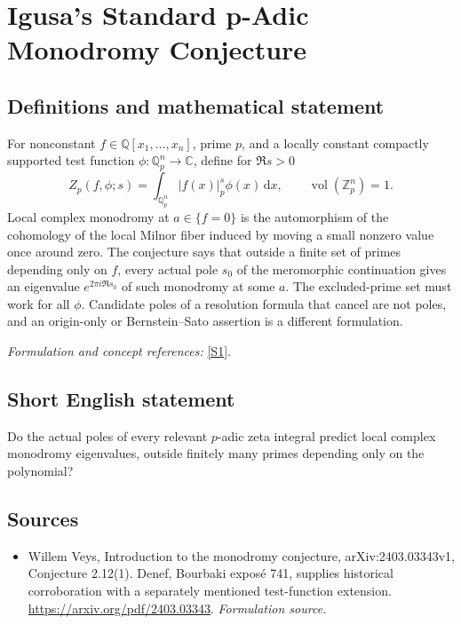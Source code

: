 \documentclass[11pt]{article}
\begin{document}
\section*{\texorpdfstring{Igusa’s Standard p-Adic Monodromy Conjecture}{Igusa’s Standard p-Adic Monodromy Conjecture}}\label{statement}
\subsection{Definitions and mathematical statement}
For nonconstant $f\in{\mathbb{Q}}[x_1,\ldots,x_n]$, prime $p$, and a locally constant compactly supported test function $\phi:{\mathbb{Q}}_p^n\to{\mathbb{C}}$, define for $\Re s>0$
\[
 Z_p(f,\phi;s)=\int_{{\mathbb{Q}}_p^n}|f(x)|_p^s\phi(x){\,\mathrm{d}} x,
 \qquad\operatorname{vol}({\mathbb{Z}}_p^n)=1.
\]
Local complex monodromy at $a\in\{f=0\}$ is the automorphism of the cohomology of the local Milnor fiber induced by moving a small nonzero value once around zero. The conjecture says that outside a finite set of primes depending only on $f$, every actual pole $s_0$ of the meromorphic continuation gives an eigenvalue $e^{2\pi i\Re s_0}$ of such monodromy at some $a$. The excluded-prime set must work for all $\phi$. Candidate poles of a resolution formula that cancel are not poles, and an origin-only or Bernstein--Sato assertion is a different formulation.
\par\smallskip\textit{Formulation and concept references:} \href{https://arxiv.org/pdf/2403.03343}{[S1]}.

\subsection{Short English statement}
Do the actual poles of every relevant $p$-adic zeta integral predict local complex monodromy eigenvalues, outside finitely many primes depending only on the polynomial?
\subsection{Sources}
\begin{itemize}
\item[S1]Willem Veys, Introduction to the monodromy conjecture, arXiv:2403.03343v1, Conjecture 2.12(1). Denef, Bourbaki exposé 741, supplies historical corroboration with a separately mentioned test-function extension.
\url{https://arxiv.org/pdf/2403.03343}.
\textit{Formulation source.}
\end{itemize}
\end{document}
